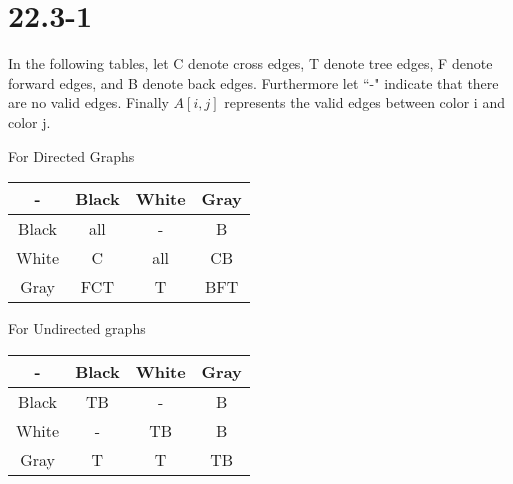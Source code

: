 \documentclass{article}
\begin{document}
  \section*{22.3-1}
    In the following tables, let C denote cross edges, T denote tree edges, F denote forward edges, and B denote back edges.
    Furthermore let ``-" indicate that there are no valid edges. 
    Finally $A[i,j]$ represents the valid edges between color i and color j.
    \begin{center}
      For Directed Graphs \\
    \begin{tabular}{|c|c|c|c|}
      \hline                    
       - & Black & White & Gray \\
      \hline                    
      Black & all & - & B       \\
      \hline                    
      White & C & all & CB      \\
      \hline                    
      Gray & FCT & T & BFT      \\
      \hline 
    \end{tabular}
    \end{center}
    
    \begin{center}
      For Undirected graphs \\
      \begin{tabular}{|c|c|c|c|}
      \hline
      - & Black & White & Gray \\ \hline
      Black & TB & - & B \\ \hline
      White & - & TB & B \\ \hline
      Gray  & T & T & TB \\ \hline
      \end{tabular}
    \end{center}
\end{document}
